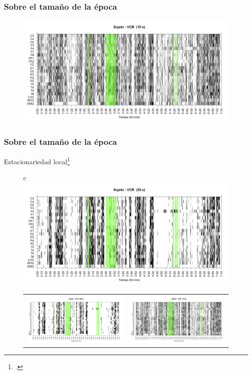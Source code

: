 \documentclass[11pt]{beamer}
\begin{document}
\begin{frame}\frametitle{Sobre el tama\~no de la \'epoca}
\begin{figure}
\centering
\includegraphics[width=0.9\linewidth]
{./img_ejemplos/VCNNS1_est_10.png} 
\end{figure}
\end{frame}


\begin{frame}\frametitle{Sobre el tama\~no de la \'epoca}
{\small Estacionariedad local\footcite{Cohen77}}
\begin{figure}
\centering
\begin{tabular}{c}
\includegraphics[width=0.4\linewidth]
{./img_ejemplos/VCNNS1_est_30.png} \\
\begin{tabular}{cc}
\includegraphics[width=0.4\linewidth]
{./img_ejemplos/VCNNS1_est_60.png} 
&
\includegraphics[width=0.4\linewidth]
{./img_ejemplos/VCNNS1_est_10.png} 
\end{tabular}
\end{tabular}
\end{figure}
\end{frame}
\end{document}
